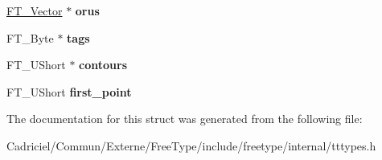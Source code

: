 \begin{DoxyCompactItemize}
\item 
\hypertarget{struct_t_t___glyph_zone_rec___a4b4193dbae177435cb6515f9a0537fa0}{\hyperlink{struct_f_t___vector__}{F\-T\-\_\-\-Vector} $\ast$ {\bfseries orus}}\label{struct_t_t___glyph_zone_rec___a4b4193dbae177435cb6515f9a0537fa0}

\item 
\hypertarget{struct_t_t___glyph_zone_rec___ae816c5c1096e333741d3f3f9d3ae0a8f}{F\-T\-\_\-\-Byte $\ast$ {\bfseries tags}}\label{struct_t_t___glyph_zone_rec___ae816c5c1096e333741d3f3f9d3ae0a8f}

\item 
\hypertarget{struct_t_t___glyph_zone_rec___ad16498cac0d4d233dce009eb74d63de1}{F\-T\-\_\-\-U\-Short $\ast$ {\bfseries contours}}\label{struct_t_t___glyph_zone_rec___ad16498cac0d4d233dce009eb74d63de1}

\item 
\hypertarget{struct_t_t___glyph_zone_rec___a9d655be80b3e31652f69ede54458faaf}{F\-T\-\_\-\-U\-Short {\bfseries first\-\_\-point}}\label{struct_t_t___glyph_zone_rec___a9d655be80b3e31652f69ede54458faaf}

\end{DoxyCompactItemize}


The documentation for this struct was generated from the following file\-:\begin{DoxyCompactItemize}
\item 
Cadriciel/\-Commun/\-Externe/\-Free\-Type/include/freetype/internal/tttypes.\-h\end{DoxyCompactItemize}
